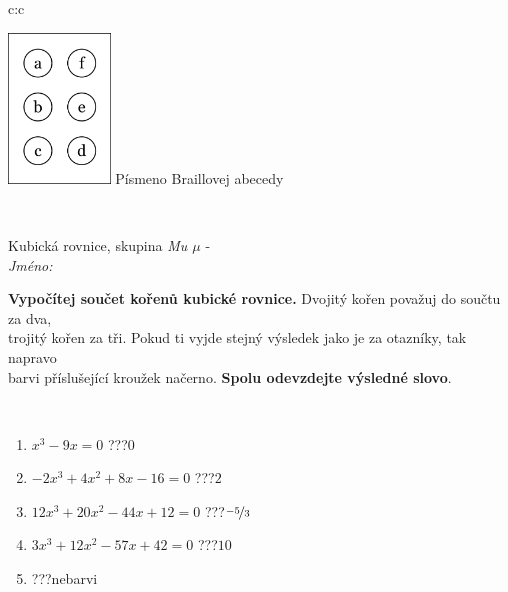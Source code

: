\documentclass[10pt]{report}
\begin{document}
\begin{tabular}{c:c}
\begin{minipage}[c][104.5mm][t]{0.5\linewidth}
\begin{center}
\begin{minipage}{0.20\linewidth}
\begin{center}
\includegraphics[height=40mm]{../images/braille.png}
{\small Písmeno Braillovej abecedy}
\end{center}
\end{minipage}
\end{center}
\end{minipage}
\\ \hdashline
\begin{minipage}[c][104.5mm][t]{0.5\linewidth}
\begin{center}
\vspace{7mm}
{\huge Kubická rovnice, skupina \textit{Mu $\mu$} -}\\[5mm]
\textit{Jméno:}\phantom{xxxxxxxxxxxxxxxxxxxxxxxxxxxxxxxxxxxxxxxxxxxxxxxxxxxxxxxxxxxxxxxxx}\\[5mm]
\begin{minipage}{0.95\linewidth}
\begin{center}
\textbf{Vypočítej součet kořenů kubické rovnice.} Dvojitý kořen považuj do součtu za dva,\\trojitý kořen za tři. Pokud ti vyjde stejný výsledek jako je za otazníky, tak napravo\\barvi příslušející kroužek načerno. \textbf{Spolu odevzdejte výsledné slovo}.
\end{center}
\end{minipage}
\\[1mm]
\begin{minipage}{0.79\linewidth}
\begin{center}
\begin{varwidth}{\linewidth}
\begin{enumerate}
\Large
\item $x^3-9x=0$\quad \dotfill\; ???\;\dotfill \quad $0$
\item $-2x^3+4x^2+8x-16=0$\quad \dotfill\; ???\;\dotfill \quad $2$
\item $12x^3+20x^2-44x+12=0$\quad \dotfill\; ???\;\dotfill \quad $\nicefrac{-5}{3}$
\item $3x^3+12x^2-57x+42=0$\quad \dotfill\; ???\;\dotfill \quad $10$
\item \quad \dotfill\; ???\;\dotfill \quad nebarvi

\end{enumerate}
\end{varwidth}
\end{center}
\end{minipage}
\end{center}
\end{minipage}
\end{tabular}
\end{document}
